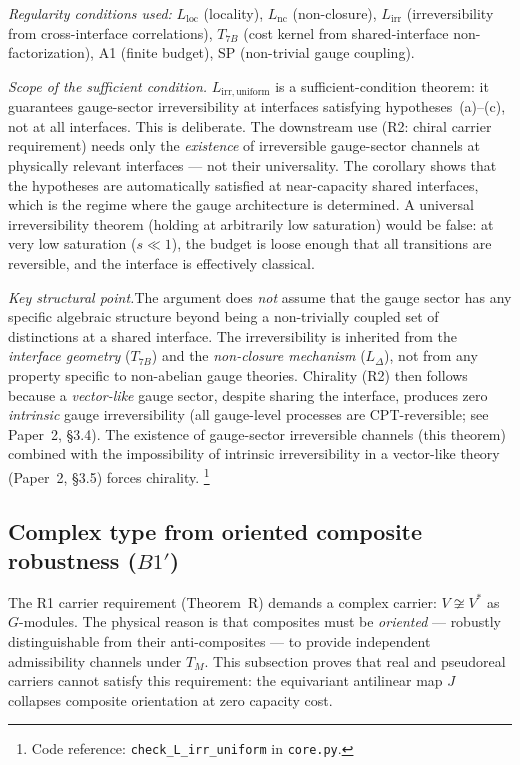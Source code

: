 \documentclass[11pt]{article}
\theoremstyle{definition}
\newcommand{\coderef}[2]{\footnote{Code reference: \texttt{#1} in \texttt{#2}.}}
\begin{document}
\noindent\textit{Regularity conditions used:}
$L_{\mathrm{loc}}$ (locality), $L_{\mathrm{nc}}$ (non-closure),
$L_{\mathrm{irr}}$ (irreversibility from cross-interface correlations),
$T_{7B}$ (cost kernel from shared-interface non-factorization),
A1 (finite budget), SP (non-trivial gauge coupling).

\smallskip\noindent\textit{Scope of the sufficient condition.}\quad
$L_{\mathrm{irr,uniform}}$ is a sufficient-condition theorem: it
guarantees gauge-sector irreversibility at interfaces satisfying
hypotheses~(a)--(c), not at all interfaces.  This is deliberate.
The downstream use (R2: chiral carrier requirement) needs only the
\emph{existence} of irreversible gauge-sector channels at physically
relevant interfaces --- not their universality.  The corollary shows
that the hypotheses are automatically satisfied at near-capacity
shared interfaces, which is the regime where the gauge architecture
is determined.  A universal irreversibility theorem (holding at
arbitrarily low saturation) would be false: at very low saturation
($s \ll 1$), the budget is loose enough that all transitions are
reversible, and the interface is effectively classical.

\smallskip\noindent\textit{Key structural point.}\quad The argument does
\emph{not} assume that the gauge sector has any specific algebraic
structure beyond being a non-trivially coupled set of distinctions at a
shared interface.  The irreversibility is inherited from the \emph{interface
geometry} ($T_{7B}$) and the \emph{non-closure mechanism} ($L_\Delta$),
not from any property specific to non-abelian gauge theories.  Chirality
(R2) then follows because a \emph{vector-like} gauge sector, despite
sharing the interface, produces zero \emph{intrinsic} gauge irreversibility
(all gauge-level processes are CPT-reversible; see Paper~2, \S3.4).  The existence of gauge-sector irreversible
channels (this theorem) combined with the impossibility of intrinsic
irreversibility in a vector-like theory (Paper~2, §3.5) forces chirality.
\coderef{check\_L\_irr\_uniform}{core.py}


\subsection{Complex type from oriented composite robustness ($B1'$)}
\label{sec:B1prime}

The R1 carrier requirement (Theorem~R) demands a complex carrier:
$V \not\cong V^*$ as $G$-modules.  The physical reason is that composites
must be \emph{oriented} --- robustly distinguishable from their
anti-composites --- to provide independent admissibility channels under $T_M$.
This subsection proves that real and pseudoreal carriers cannot satisfy
this requirement: the equivariant antilinear map $J$ collapses composite
orientation at zero capacity cost.
\end{document}
